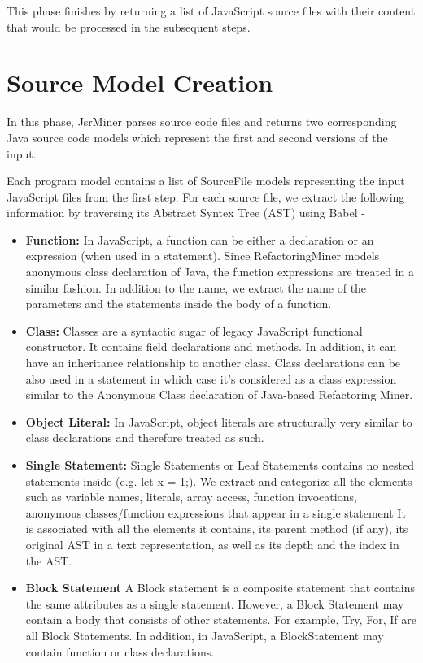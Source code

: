 \documentclass[letterpaper,12pt,onecolumn,final]{report}
\begin{document}
This phase finishes by returning a list of JavaScript source files with their content that would be processed in the subsequent steps.

\section {Source Model Creation}
In this phase, JsrMiner parses source code files and returns two corresponding Java source code models which represent the first and second versions of the input.

Each program model contains a list of SourceFile models representing the input JavaScript files from the first step. For each source file, we extract the following information by traversing its Abstract Syntex Tree (AST) using Babel -

\begin{itemize}
\item \textbf{Function:} In JavaScript, a function can be either a declaration or an expression (when used in a statement). Since RefactoringMiner models anonymous class declaration of Java, the function expressions are treated in a similar fashion. In addition to the name, we extract the name of the parameters and the statements inside the body of a function. 

\item \textbf{Class:} Classes are a syntactic sugar of legacy JavaScript functional constructor. It contains field declarations and methods. In addition, it can have an inheritance relationship to another class. Class declarations can be also used in a statement in which case it's considered as a class expression similar to the Anonymous Class declaration of Java-based Refactoring Miner.

\item \textbf{Object Literal:} In JavaScript, object literals are structurally very similar to class declarations and therefore treated as such.

\item \textbf{Single Statement:}
Single Statements or Leaf Statements contains no nested statements inside (e.g. let x = 1;). We extract and categorize all the elements such as variable names, literals, array access, function invocations, anonymous classes/function expressions that appear in a single statement It is associated with all the elements it contains, its parent method (if any), its original AST in a text representation, as well as its depth and the index in the AST.

\item  \textbf{Block Statement}
A Block statement is a composite statement that contains the same attributes as a single statement. However, a Block Statement may contain a body that consists of other statements. For example, Try, For, If are all Block Statements. In addition, in JavaScript, a BlockStatement may contain function or class declarations.
\end{itemize}
\end{document}
